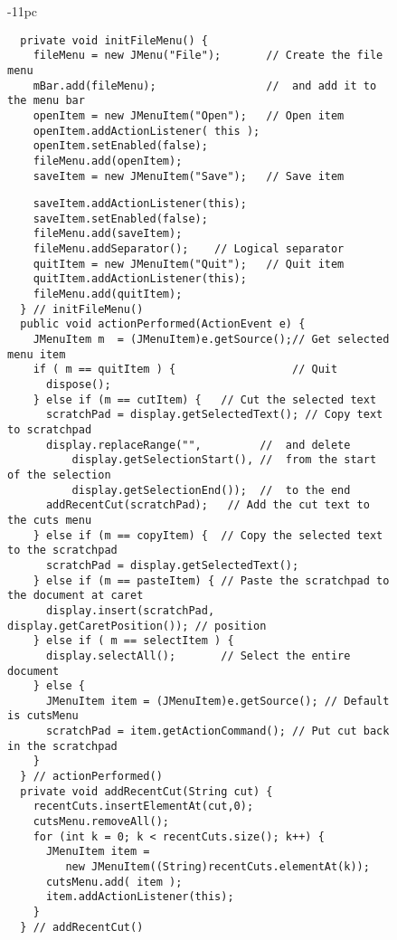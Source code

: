 \begin{figure}[h!]
\begin{jjjlistingleft}[37pc]{-11pc}
\begin{lstlisting}
  private void initFileMenu() {
    fileMenu = new JMenu("File");       // Create the file menu
    mBar.add(fileMenu);                 //  and add it to the menu bar
    openItem = new JMenuItem("Open");   // Open item
    openItem.addActionListener( this );
    openItem.setEnabled(false);
    fileMenu.add(openItem);
    saveItem = new JMenuItem("Save");   // Save item
\end{lstlisting}
\end{jjjlistingleft}
\end{figure}

\clearpage
\begin{figure}[h!]
\addtocounter{figure}{-1}
\jjjprogstart
\begin{jjjlisting}[37pc]
\begin{lstlisting}
    saveItem.addActionListener(this);
    saveItem.setEnabled(false);
    fileMenu.add(saveItem);
    fileMenu.addSeparator();    // Logical separator
    quitItem = new JMenuItem("Quit");   // Quit item
    quitItem.addActionListener(this);
    fileMenu.add(quitItem);
  } // initFileMenu()
  public void actionPerformed(ActionEvent e) {
    JMenuItem m  = (JMenuItem)e.getSource();// Get selected menu item
    if ( m == quitItem ) {                  // Quit
      dispose();
    } else if (m == cutItem) {   // Cut the selected text
      scratchPad = display.getSelectedText(); // Copy text to scratchpad
      display.replaceRange("",         //  and delete
          display.getSelectionStart(), //  from the start of the selection
          display.getSelectionEnd());  //  to the end
      addRecentCut(scratchPad);   // Add the cut text to the cuts menu
    } else if (m == copyItem) {  // Copy the selected text to the scratchpad
      scratchPad = display.getSelectedText();
    } else if (m == pasteItem) { // Paste the scratchpad to the document at caret
      display.insert(scratchPad, display.getCaretPosition()); // position
    } else if ( m == selectItem ) {
      display.selectAll();       // Select the entire document
    } else {
      JMenuItem item = (JMenuItem)e.getSource(); // Default is cutsMenu
      scratchPad = item.getActionCommand(); // Put cut back in the scratchpad
    }
  } // actionPerformed()
  private void addRecentCut(String cut) {
    recentCuts.insertElementAt(cut,0);
    cutsMenu.removeAll();
    for (int k = 0; k < recentCuts.size(); k++) {
      JMenuItem item = 
         new JMenuItem((String)recentCuts.elementAt(k));
      cutsMenu.add( item );
      item.addActionListener(this);
    }
  } // addRecentCut()


\end{lstlisting}
\end{jjjlisting}
\end{figure}
